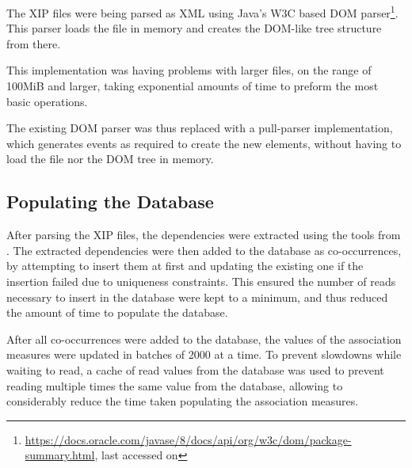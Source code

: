 The \ac{XIP} files were being parsed as XML using Java's W3C based \ac{DOM}
parser\footnote{\url{https://docs.oracle.com/javase/8/docs/api/org/w3c/dom/package-summary.html},
last accessed on }. This parser loads the file in memory and
creates the \ac{DOM}-like tree structure from there.

This implementation was having problems with larger files, on the range of
100MiB and larger, taking exponential amounts of time to preform the most basic
operations.

The existing \ac{DOM} parser was thus replaced with a pull-parser
implementation, which generates events as required to create the new elements,
without having to load the file nor the \ac{DOM} tree in memory.

\subsection{Populating the Database}

After parsing the \ac{XIP} files, the dependencies were extracted using the
tools from \cite{correia2015syntax}. The extracted dependencies were then added
to the database as co-occurrences, by attempting to insert them at first and
updating the existing one if the insertion failed due to uniqueness constraints.
This ensured the number of reads necessary to insert in the database were kept
to a minimum, and thus reduced the amount of time to populate the database.

After all co-occurrences were added to the database, the values of the
association measures were updated in batches of 2000 at a time. To prevent
slowdowns while waiting to read, a cache of read values from the database was
used to prevent reading multiple times the same value from the database,
allowing to considerably reduce the time taken populating the association
measures.

